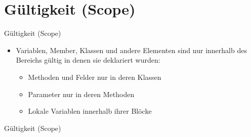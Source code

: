 \section{Gültigkeit (Scope)}
\begin{frame}{Gültigkeit (Scope)}
	\begin{itemize}
		\item Variablen, Member, Klassen und andere Elementen sind nur innerhalb des Bereichs gültig in denen sie deklariert wurden:
		\begin{itemize}
			\item Methoden und Felder nur in deren Klassen
			\item Parameter nur in deren Methoden
			\item Lokale Variablen innerhalb ihrer Blöcke
		\end{itemize}
	\end{itemize}
\end{frame}

\begin{frame}{Gültigkeit (Scope)}
	
\end{frame}


